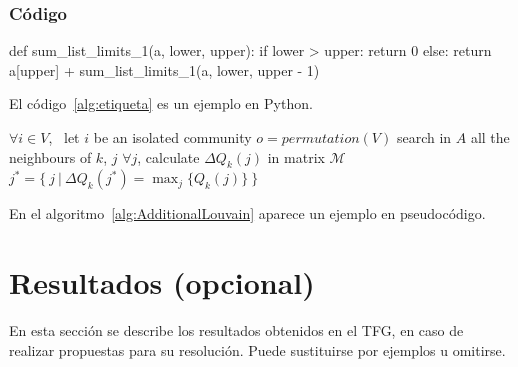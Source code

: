 \documentclass[12pt,twoside,titlepage]{report}
\newcommand\blankpage{%
    \newpage
    \null
    \thispagestyle{empty}%
    \newpage}
\begin{document}
\newpage



\subsection{Código}


\begin{mypython}[float={!t},caption={Titulo del algoritmo/código.},label={alg:etiqueta}]
def sum_list_limits_1(a, lower, upper):
    if lower > upper:
        return 0
    else:
        return a[upper] + sum_list_limits_1(a, lower, upper - 1)
\end{mypython}
El código~\ref{alg:etiqueta} es un ejemplo en Python.



\begin{algorithm}
\begin{algorithmic}[1]
\STATE $\forall i \in V$, \ let $i$ be an isolated community
\STATE $o=permutation(V)$
\STATE search in $A$ all the neighbours of $k$, $j$
\STATE $\forall j$, calculate $\Delta Q_k(j)$ in matrix $\mathcal{M}$
\STATE $j^*=\{ \ j \ | \ \Delta Q_k(j^*)=\max_j\{Q_k(j)\} \ \}$
\ELSE
{}
\ENDIF
\ENDFOR
\end{algorithmic}\caption{\textit{Additional Louvain} \textbf{input}=$\left(A, \ \mathcal{M}\right)$ \textbf{output}=$P$}
\label{alg:AdditionalLouvain}
\end{algorithm}
En el algoritmo~\ref{alg:AdditionalLouvain} aparece un ejemplo en pseudocódigo.











\chapter{Resultados (opcional)}
\label{sec:resulObtenidos}


En esta sección se describe los resultados obtenidos en el TFG, en caso de realizar propuestas para su resolución. Puede sustituirse por ejemplos u omitirse.

\blankpage







\end{document}

